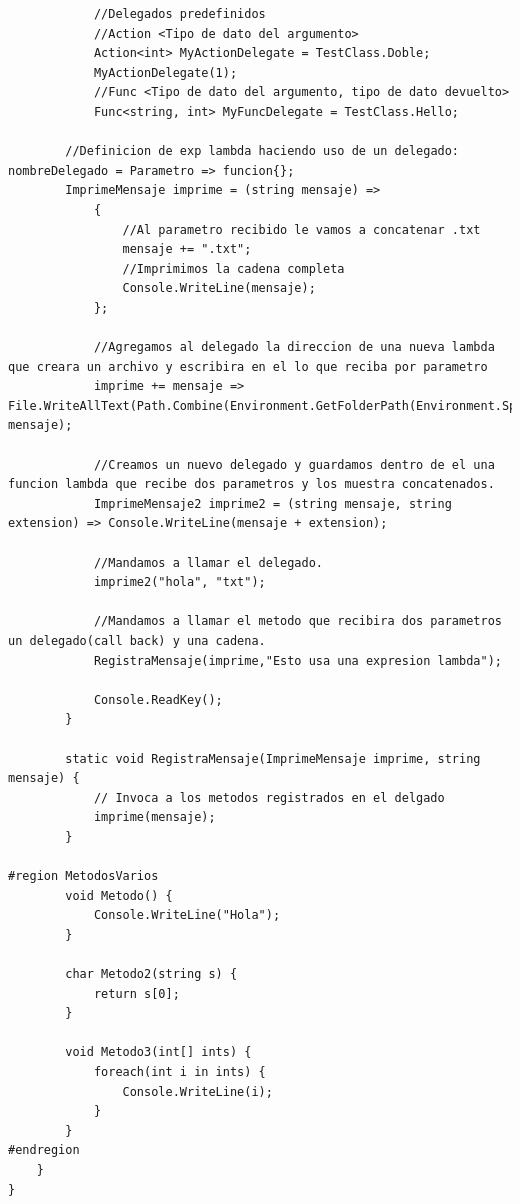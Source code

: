 \documentclass[12pt,a4paper]{report}
\begin{document}
\begin{lstlisting}
            //Delegados predefinidos
            //Action <Tipo de dato del argumento>
            Action<int> MyActionDelegate = TestClass.Doble;
            MyActionDelegate(1);
            //Func <Tipo de dato del argumento, tipo de dato devuelto>
            Func<string, int> MyFuncDelegate = TestClass.Hello;

        //Definicion de exp lambda haciendo uso de un delegado: nombreDelegado = Parametro => funcion{};
        ImprimeMensaje imprime = (string mensaje) =>
            {
                //Al parametro recibido le vamos a concatenar .txt
                mensaje += ".txt";
                //Imprimimos la cadena completa
                Console.WriteLine(mensaje);
            };

            //Agregamos al delegado la direccion de una nueva lambda que creara un archivo y escribira en el lo que reciba por parametro
            imprime += mensaje => File.WriteAllText(Path.Combine(Environment.GetFolderPath(Environment.SpecialFolder.MyDocuments),"mensaje_lambda.txt"), mensaje);

            //Creamos un nuevo delegado y guardamos dentro de el una funcion lambda que recibe dos parametros y los muestra concatenados.
            ImprimeMensaje2 imprime2 = (string mensaje, string extension) => Console.WriteLine(mensaje + extension);

            //Mandamos a llamar el delegado.
            imprime2("hola", "txt");

            //Mandamos a llamar el metodo que recibira dos parametros un delegado(call back) y una cadena.
            RegistraMensaje(imprime,"Esto usa una expresion lambda");

            Console.ReadKey();
        }

        static void RegistraMensaje(ImprimeMensaje imprime, string mensaje) {
            // Invoca a los metodos registrados en el delgado
            imprime(mensaje);
        }

#region MetodosVarios
        void Metodo() {
            Console.WriteLine("Hola");
        }

        char Metodo2(string s) {
            return s[0];
        }

        void Metodo3(int[] ints) {
            foreach(int i in ints) {
                Console.WriteLine(i);
            }
        }
#endregion
    }
}
\end{lstlisting}
\end{document}
